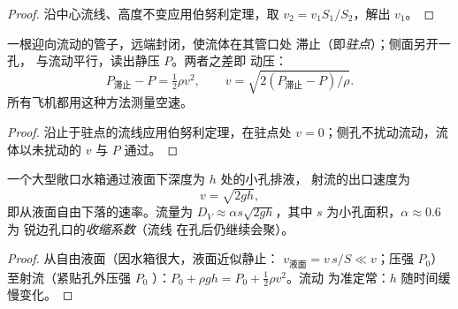 \begin{proof}
沿中心流线、高度不变应用伯努利定理，取 $v_2 =
v_1S_1/S_2$，解出 $v_1$。
\end{proof}

\begin{proposition}[皮托管]\label{prop:b2:euler-bernoulli:pitot}
一根迎向流动的管子，远端封闭，使流体在其管口处
滞止（即\emph{驻点}）；侧面另开一孔，
与流动平行，读出静压 $P$。两者之差即
动压：
\[
P_{\text{滞止}} - P = \tfrac12\rho v^2 , \qquad v = \sqrt{2(P_{\text{滞止}} - P)/\rho} .
\]
所有飞机都用这种方法测量空速。
\end{proposition}

\begin{proof}
沿止于驻点的流线应用伯努利定理，在驻点处
$v = 0$；侧孔不扰动流动，流体以未扰动的
$v$ 与 $P$ 通过。
\end{proof}

\begin{proposition}[托里拆利公式]\label{prop:b2:euler-bernoulli:torricelli}
一个大型敞口水箱通过液面下深度为 $h$ 处的小孔排液，
射流的出口速度为
\[
v = \sqrt{2gh} ,
\]
即从液面自由下落的速率。流量为 $D_V \approx
\alpha s\sqrt{2gh}$，其中 $s$ 为小孔面积，$\alpha \approx 0.6$ 为
锐边孔口的\emph{收缩系数}（流线
在孔后仍继续会聚）。
\end{proposition}

\begin{proof}
从自由液面（因水箱很大，液面近似静止：
$v_{\text{液面}} = v\,s/S \ll v$；压强 $P_0$）至射流（紧贴孔外压强 $P_0$
）：$P_0 + \rho gh = P_0 + \tfrac12\rho v^2$。流动
为准定常：$h$ 随时间缓慢变化。
\end{proof}

